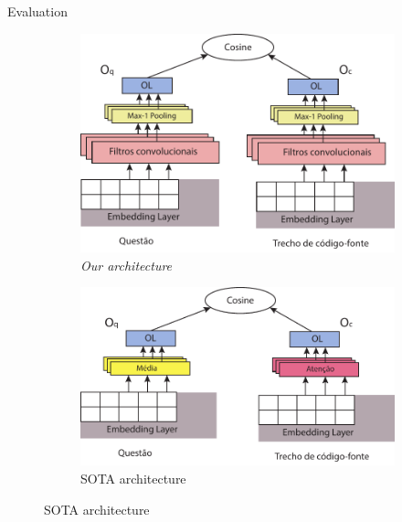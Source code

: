 \documentclass{beamer}
\begin{document}
    \begin{frame}{Evaluation}
      \begin{figure}
          \begin{subfigure}[h]{0.45\textwidth}
            \includegraphics[width=\textwidth]{resources/cnn-architecture-proposal.pdf}
            \caption{\textit{Our architecture}}
            \label{fig:our-architecture}
          \end{subfigure}
          \hspace{1em}%
          \begin{subfigure}[h]{0.45\textwidth}
            \includegraphics[width=\textwidth]{resources/unif-architecture.pdf}
            \caption{SOTA architecture}
            \label{fig:unif-architecture}
          \end{subfigure}
          

\end{figure}
\end{frame}
\end{document}
